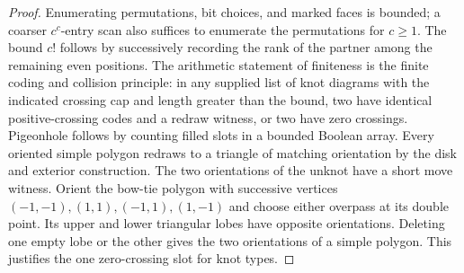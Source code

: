 \begin{proof}
Enumerating permutations, bit choices, and marked faces is bounded; a
coarser $c^c$-entry scan also suffices to enumerate the permutations for
$c\ge1$. The bound $c!$ follows by successively recording the rank of the
partner among the remaining even positions. The arithmetic statement of
finiteness is the finite coding and collision principle: in any supplied
list of knot diagrams with the indicated crossing cap and length greater
than the bound, two have identical positive-crossing codes and a redraw
witness, or two have zero crossings. Pigeonhole follows by counting
filled slots in a bounded Boolean array. Every oriented simple polygon
redraws to a triangle of matching orientation by the disk and exterior
construction. The two orientations of the unknot have a short move
witness. Orient the bow-tie polygon with successive vertices
$(-1,-1),(1,1),(-1,1),(1,-1)$ and choose either overpass at its double
point. Its upper and lower triangular lobes have opposite orientations.
Deleting one empty lobe or the other gives the two orientations of a
simple polygon. This justifies the one zero-crossing slot for knot types.
\end{proof}

